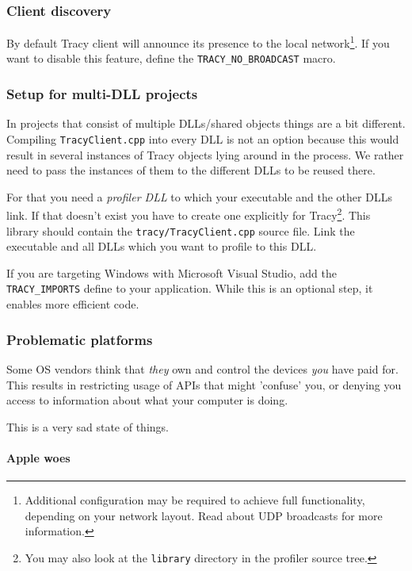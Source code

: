 \documentclass[hidelinks,titlepage,a4paper]{article}
\begin{document}
\subsubsection{Client discovery}

By default Tracy client will announce its presence to the local network\footnote{Additional configuration may be required to achieve full functionality, depending on your network layout. Read about UDP broadcasts for more information.}. If you want to disable this feature, define the \texttt{TRACY\_NO\_BROADCAST} macro.

\subsubsection{Setup for multi-DLL projects}

In projects that consist of multiple DLLs/shared objects things are a bit different. Compiling \texttt{TracyClient.cpp} into every DLL is not an option because this would result in several instances of Tracy objects lying around in the process. We rather need to pass the instances of them to the different DLLs to be reused there.

For that you need a \emph{profiler DLL} to which your executable and the other DLLs link. If that doesn't exist you have to create one explicitly for Tracy\footnote{You may also look at the \texttt{library} directory in the profiler source tree.}. This library should contain the \texttt{tracy/TracyClient.cpp} source file. Link the executable and all DLLs which you want to profile to this DLL.

If you are targeting Windows with Microsoft Visual Studio, add the \texttt{TRACY\_IMPORTS} define to your application. While this is an optional step, it enables more efficient code.

\subsubsection{Problematic platforms}

Some OS vendors think that \emph{they} own and control the devices \emph{you} have paid for. This results in restricting usage of APIs that might 'confuse' you, or denying you access to information about what your computer is doing.

This is a very sad state of things.

\paragraph{Apple woes}
\end{document}
